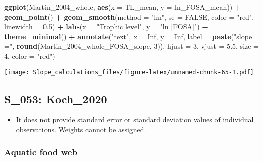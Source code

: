 \documentclass[
]{article}
\newenvironment{Shaded}{\begin{snugshade}}{\end{snugshade}}
\newcommand{\AttributeTok}[1]{\textcolor[rgb]{0.13,0.29,0.53}{#1}}
\newcommand{\ConstantTok}[1]{\textcolor[rgb]{0.56,0.35,0.01}{#1}}
\newcommand{\DecValTok}[1]{\textcolor[rgb]{0.00,0.00,0.81}{#1}}
\newcommand{\FloatTok}[1]{\textcolor[rgb]{0.00,0.00,0.81}{#1}}
\newcommand{\FunctionTok}[1]{\textcolor[rgb]{0.13,0.29,0.53}{\textbf{#1}}}
\newcommand{\NormalTok}[1]{#1}
\newcommand{\SpecialCharTok}[1]{\textcolor[rgb]{0.81,0.36,0.00}{\textbf{#1}}}
\newcommand{\StringTok}[1]{\textcolor[rgb]{0.31,0.60,0.02}{#1}}
\providecommand{\tightlist}{%
  \setlength{\itemsep}{0pt}\setlength{\parskip}{0pt}}
\begin{document}
\begin{Shaded}
\begin{Highlighting}[]
\FunctionTok{ggplot}\NormalTok{(Martin\_2004\_whole, }\FunctionTok{aes}\NormalTok{(}\AttributeTok{x =}\NormalTok{ TL\_mean, }\AttributeTok{y =}\NormalTok{ ln\_FOSA\_mean)) }\SpecialCharTok{+}
  \FunctionTok{geom\_point}\NormalTok{() }\SpecialCharTok{+}
  \FunctionTok{geom\_smooth}\NormalTok{(}\AttributeTok{method =} \StringTok{"lm"}\NormalTok{, }\AttributeTok{se =} \ConstantTok{FALSE}\NormalTok{, }\AttributeTok{color =} \StringTok{"red"}\NormalTok{, }\AttributeTok{linewidth =} \FloatTok{0.5}\NormalTok{) }\SpecialCharTok{+}
  \FunctionTok{labs}\NormalTok{(}\AttributeTok{x =} \StringTok{"Trophic level"}\NormalTok{,}
       \AttributeTok{y =} \StringTok{"ln [FOSA]"}\NormalTok{) }\SpecialCharTok{+}
  \FunctionTok{theme\_minimal}\NormalTok{() }\SpecialCharTok{+}
  \FunctionTok{annotate}\NormalTok{(}\StringTok{"text"}\NormalTok{, }\AttributeTok{x =} \ConstantTok{Inf}\NormalTok{, }\AttributeTok{y =} \ConstantTok{Inf}\NormalTok{, }\AttributeTok{label =} \FunctionTok{paste}\NormalTok{(}\StringTok{"slope ="}\NormalTok{, }\FunctionTok{round}\NormalTok{(Martin\_2004\_whole\_FOSA\_slope, }\DecValTok{3}\NormalTok{)), }
           \AttributeTok{hjust =} \DecValTok{3}\NormalTok{, }\AttributeTok{vjust =} \FloatTok{5.5}\NormalTok{, }\AttributeTok{size =} \DecValTok{4}\NormalTok{, }\AttributeTok{color =} \StringTok{"red"}\NormalTok{)}
\end{Highlighting}
\end{Shaded}

\texttt{[image: Slope\_calculations\_files/figure-latex/unnamed-chunk-65-1.pdf]}

\subsection{S\_053: Koch\_2020}\label{s_053-koch_2020-1}

\begin{itemize}
\tightlist
\item
  It does not provide standard error or standard deviation values of
  individual observations. Weights cannot be assigned.
\end{itemize}

\subsubsection{Aquatic food web}\label{aquatic-food-web}
\end{document}
